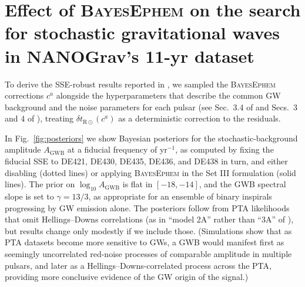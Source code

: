 \documentclass{aastex63}
\begin{document}
\section{Effect of \textsc{BayesEphem} on the search for stochastic gravitational waves in NANOGrav's 11-yr dataset}
\label{sec:results}

To derive the SSE-robust results reported in \cite{2018ApJ...859...47A}, we sampled the \textsc{BayesEphem} corrections $c^a$ alongside the hyperparameters that describe the common GW background and the noise parameters for each pulsar (see Sec.\ 3.4 of \citealt{2018ApJ...859...47A} and Secs.\ 3 and 4 of \citealt{2016ApJ...821...13A}), treating $\delta t_{\mathrm{R}\odot}(c^a)$ as a deterministic correction to the residuals.

In Fig.\ \ref{fig:posteriors} we show Bayesian posteriors for the stochastic-background amplitude $A_\mathrm{GWB}$ at a fiducial frequency of yr$^{-1}$, as computed by fixing the fiducial SSE to DE421, DE430, DE435, DE436, and DE438 in turn, and either disabling (dotted lines) or applying \textsc{BayesEphem} in the Set III formulation (solid lines). The prior on $\log_{10} A_\mathrm{GWB}$ is flat in $[-18,-14]$, and the GWB spectral slope is set to $\gamma = 13/3$, as appropriate for an ensemble of binary inspirals progressing by GW emission alone. The posteriors follow from PTA likelihoods that omit Hellings--Downs correlations (as in ``model 2A'' rather than ``3A'' of \citealt{2018ApJ...859...47A}), but results change only modestly if we include those.
(Simulations show that as PTA datasets become more sensitive to GWs, a GWB would manifest first as seemingly uncorrelated red-noise processes of comparable amplitude in multiple pulsars, and later as a Hellings--Downs-correlated process across the PTA, providing more conclusive evidence of the GW origin of the signal.)
\end{document}
